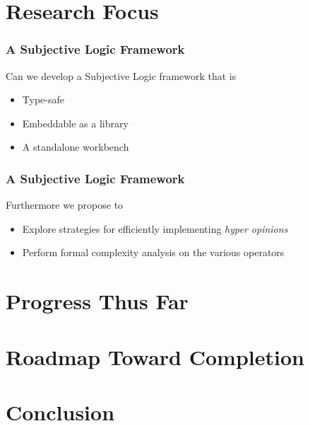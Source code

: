 \documentclass{beamer}
\begin{document}

\section{Research Focus}

\begin{frame}
\frametitle{A Subjective Logic Framework}

Can we develop a Subjective Logic framework that is

\begin{itemize}
  \item Type-safe
  \item Embeddable as a library
  \item A standalone workbench
\end{itemize}

\end{frame}

\begin{frame}
\frametitle{A Subjective Logic Framework}

Furthermore we propose to

\begin{itemize}
  \item Explore strategies for efficiently implementing \emph{hyper opinions}
  \item Perform formal complexity analysis on the various operators
\end{itemize}

\end{frame}


\section{Progress Thus Far}


\section{Roadmap Toward Completion}


\section{Conclusion}
\end{document}
